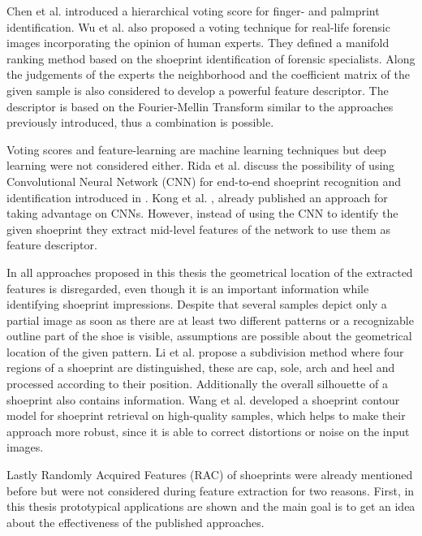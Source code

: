 \documentclass[draft,final]{vutinfth} %
\begin{document}
Chen et al. \cite{chen2013hierarchical} introduced a hierarchical voting score for finger- and palmprint identification.
Wu et al. \cite{wu2019losgsr} also proposed a voting technique for real-life forensic images incorporating the opinion of human experts.
They defined a manifold ranking method based on the shoeprint identification of forensic specialists.
Along the judgements of the experts the neighborhood and the coefficient matrix of the given sample is also considered to develop a powerful feature descriptor.
The descriptor is based on the Fourier-Mellin Transform similar to the approaches previously introduced, thus a combination is possible.
\par
Voting scores and feature-learning are machine learning techniques but deep learning \cite{lecun2015deep} were not considered either.
Rida et al. \cite{rida2019forensic} discuss the possibility of using Convolutional Neural Network (CNN) for end-to-end shoeprint recognition and identification introduced in \cite{lecun1998gradient}.
Kong et al. \cite{kong2017cross}, \cite{kong2019cross} already published an approach for taking advantage on CNNs.
However, instead of using the CNN to identify the given shoeprint they extract mid-level features of the network to use them as feature descriptor.
\par
In all approaches proposed in this thesis the geometrical location of the extracted features is disregarded, even though it is an important information while identifying shoeprint impressions.
Despite that several samples depict only a partial image as soon as there are at least two different patterns or a recognizable outline part of the shoe is visible, assumptions are possible about the geometrical location of the given pattern.
Li et al. \cite{li2015secondary} propose a subdivision method where four regions of a shoeprint are distinguished, these are cap, sole, arch and heel and processed according to their position.
Additionally the overall silhouette of a shoeprint also contains information.
Wang et al. \cite{wang2014automatic} developed a shoeprint contour model for shoeprint retrieval on high-quality samples, which helps to make their approach more robust, since it is able to correct distortions or noise on the input images.
\par
Lastly Randomly Acquired Features (RAC) of shoeprints were already mentioned before but were not considered during feature extraction for two reasons.
First, in this thesis prototypical applications are shown and the main goal is to get an idea about the effectiveness of the published approaches.
\end{document}
